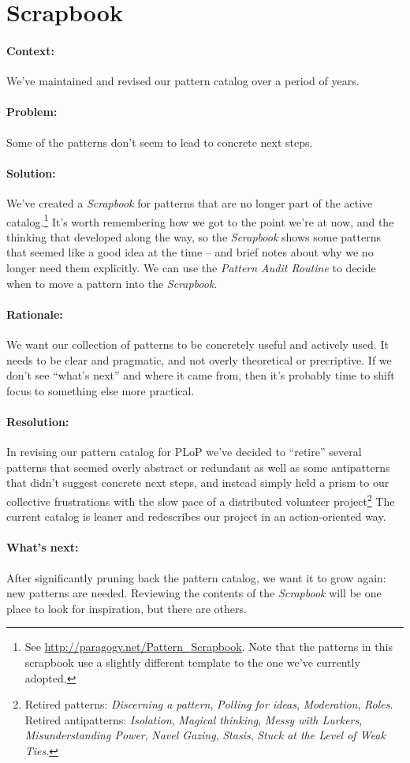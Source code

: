 \section{Scrapbook}

\paragraph{Context:} We've maintained and revised our pattern catalog over a period of years.
\paragraph{Problem:} Some of the patterns don't seem to lead to concrete next steps.
\paragraph{Solution:} We've created a \emph{Scrapbook} for patterns that are no longer part of the active catalog.\footnote{See \url{http://paragogy.net/Pattern_Scrapbook}.  Note that the patterns in this scrapbook use a slightly different template to the one we've currently adopted.}  It's worth remembering how we got to the point we're at now, and the thinking that developed along the way, so the \emph{Scrapbook} shows some patterns that seemed like a good idea at the time -- and brief notes about why we no longer need them explicitly.  We can use the \emph{Pattern Audit Routine} to decide when to move a pattern into the \emph{Scrapbook}.
\paragraph{Rationale:} We want our collection of patterns to be concretely useful and actively used.  It needs to be clear and pragmatic, and not overly theoretical or precriptive.  If we don't see ``what's next'' and where it came from, then it's probably time to shift focus to something else more practical.
\paragraph{Resolution:}  In revising our pattern catalog for PLoP we've decided to ``retire'' several patterns that seemed overly abstract or redundant as well as some antipatterns that didn't suggest concrete next steps, and instead simply held a prism to our collective frustrations with the slow pace of a distributed volunteer project\footnote{Retired patterns: \emph{Discerning a pattern}, \emph{Polling for ideas}, \emph{Moderation}, \emph{Roles}. Retired antipatterns: \emph{Isolation}, \emph{Magical thinking}, \emph{Messy with Lurkers}, \emph{Misunderstanding Power}, \emph{Navel Gazing}, \emph{Stasis}, \emph{Stuck at the Level of Weak Ties}.}  The current catalog is leaner and redescribes our project in an action-oriented way. 
\paragraph{What's next:} After significantly pruning back the pattern catalog, we want it to grow again: new patterns are needed.  Reviewing the contents of the \emph{Scrapbook} will be one place to look for inspiration, but there are others.

